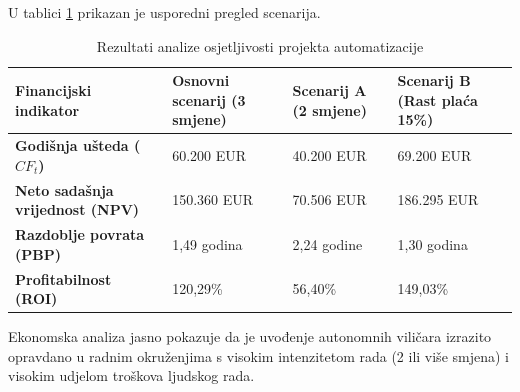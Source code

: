 \documentclass[12pt,a4paper]{article}
\begin{document}
U tablici \ref{tab:senzitivnost} prikazan je usporedni pregled scenarija.

\begin{table}[h]
\centering
\caption{Rezultati analize osjetljivosti projekta automatizacije}
\label{tab:senzitivnost}
\begin{tabularx}{\textwidth}{|l|X|X|X|}
\hline
\textbf{Financijski indikator} & \textbf{Osnovni scenarij (3 smjene)} & \textbf{Scenarij A (2 smjene)} & \textbf{Scenarij B (Rast plaća 15\%)} \\ \hline
\textbf{Godišnja ušteda ($CF_t$)} & 60.200 EUR & 40.200 EUR & 69.200 EUR \\ \hline
\textbf{Neto sadašnja vrijednost (NPV)} & 150.360 EUR & 70.506 EUR & 186.295 EUR \\ \hline
\textbf{Razdoblje povrata (PBP)} & 1,49 godina & 2,24 godine & 1,30 godina \\ \hline
\textbf{Profitabilnost (ROI)} & 120,29\% & 56,40\% & 149,03\% \\ \hline
\end{tabularx}
\end{table}

Ekonomska analiza jasno pokazuje da je uvođenje autonomnih viličara izrazito opravdano u radnim okruženjima s visokim intenzitetom rada (2 ili više smjena) i visokim udjelom troškova ljudskog rada.
\end{document}
